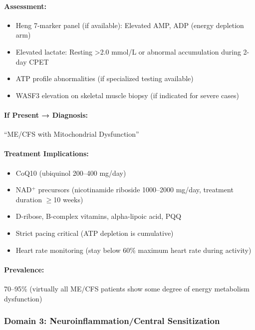 \paragraph{Assessment:}
\begin{itemize}
    \item Heng 7-marker panel (if available): Elevated AMP, ADP (energy depletion arm)~\cite{heng2025mecfs}
    \item Elevated lactate: Resting >2.0 mmol/L or abnormal accumulation during 2-day CPET~\cite{Lien2019lactate}
    \item ATP profile abnormalities (if specialized testing available)
    \item WASF3 elevation on skeletal muscle biopsy (if indicated for severe cases)~\cite{wang2023wasf3}
\end{itemize}

\paragraph{If Present → Diagnosis:} ``ME/CFS with Mitochondrial Dysfunction''

\paragraph{Treatment Implications:}
\begin{itemize}
    \item CoQ10 (ubiquinol 200--400 mg/day)
    \item NAD$^+$ precursors (nicotinamide riboside 1000--2000 mg/day, treatment duration $\geq$10 weeks)
    \item D-ribose, B-complex vitamins, alpha-lipoic acid, PQQ
    \item Strict pacing critical (ATP depletion is cumulative)
    \item Heart rate monitoring (stay below 60\% maximum heart rate during activity)
\end{itemize}

\paragraph{Prevalence:} 70--95\% (virtually all ME/CFS patients show some degree of energy metabolism dysfunction)

\subsubsection{Domain 3: Neuroinflammation/Central Sensitization}

